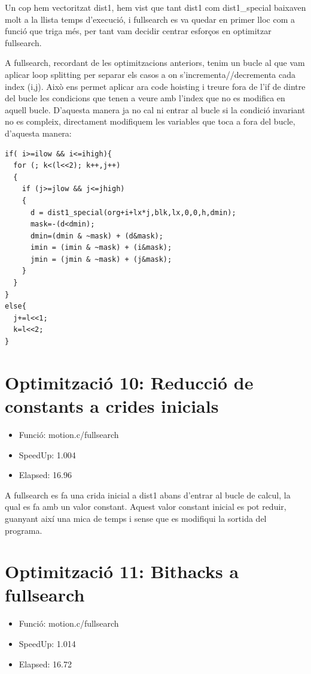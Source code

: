 Un cop hem vectoritzat dist1, hem vist que tant dist1 com dist1\_special baixaven molt a la llista temps d'execució, i fullsearch es va quedar en primer lloc com a funció que triga més, per tant vam decidir centrar esforços en optimitzar fullsearch.

A fullsearch, recordant de les optimitzacions anteriors, tenim un bucle al que vam aplicar loop splitting per separar els casos a on s'incrementa//decrementa cada index (i,j). Això ens permet aplicar ara code hoisting i treure fora de l'if de dintre del bucle les condicions que tenen a veure amb l'index que no es modifica en aquell bucle. D'aquesta manera ja no cal ni entrar al bucle si la condició invariant no es compleix, directament modifiquem les variables que toca a fora del bucle, d'aquesta manera:

\begin{lstlisting}
if( i>=ilow && i<=ihigh){
  for (; k<(l<<2); k++,j++)
  {
    if (j>=jlow && j<=jhigh)
    {
      d = dist1_special(org+i+lx*j,blk,lx,0,0,h,dmin);
      mask=-(d<dmin);
      dmin=(dmin & ~mask) + (d&mask);
      imin = (imin & ~mask) + (i&mask);
      jmin = (jmin & ~mask) + (j&mask);
    }
  } 
}
else{
  j+=l<<1;
  k=l<<2;	
}	 	
\end{lstlisting}

\section{Optimitzaci\'o 10: Reducci\'o de constants a crides inicials}
\begin{itemize}
\item{Funció: motion.c/fullsearch}
\item{SpeedUp: 1.004 }
\item{Elapsed: 16.96}
\end{itemize}

A fullsearch es fa una crida inicial a dist1 abans d'entrar al bucle de calcul, la qual es fa amb un valor constant. Aquest valor constant inicial es pot reduir, guanyant així una mica de temps i sense que es modifiqui la sortida del programa.

\section{Optimitzaci\'o 11: Bithacks a fullsearch}
\begin{itemize}
\item{Funció: motion.c/fullsearch}
\item{SpeedUp:  1.014}
\item{Elapsed:  16.72}
\end{itemize}


